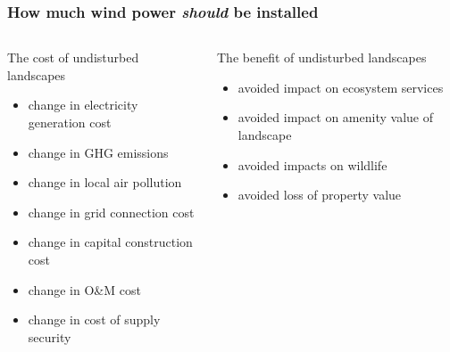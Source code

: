 \documentclass[aspectratio=1610, xcolor=dvipsnames]{beamer}
\begin{document}
    \begin{frame}
        \frametitle{How much wind power \emph{should} be installed}
        \begin{columns}[T]
            \begin{column}{7cm}
                \begin{block}{The cost of undisturbed landscapes}
                    \begin{itemize}
                        \item change in electricity generation cost
                        \item change in GHG emissions
                        \item change in local air pollution
                        \item change in grid connection cost
                        \item change in capital construction cost
                        \item change in O\&M cost
                        \item change in cost of supply security
                    \end{itemize}
                \end{block}
            \end{column}

            \begin{column}{7cm}
                \begin{block}{The benefit of undisturbed landscapes}
                    \begin{itemize}
                        \item avoided impact on ecosystem services
                        \item avoided impact on amenity value of landscape
                        \item avoided impacts on wildlife
                        \item avoided loss of property value
                    \end{itemize}
                \end{block}
            \end{column}
        \end{columns}
    \end{frame}
\end{document}
